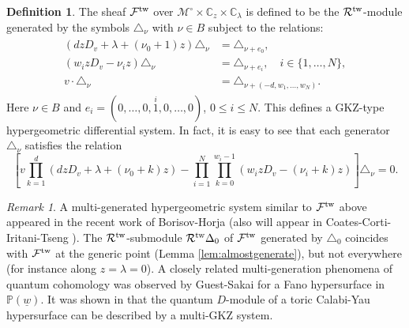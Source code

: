 \documentclass[11pt]{amsart}
\theoremstyle{definition} %
\newtheorem{defn}[thm]{Definition} %
\theoremstyle{remark} %
\newtheorem{rem}[thm]{Remark}%
\newcommand{\CC}{\mathbb C}
\newcommand{\PP}{\mathbb P}
\newcommand{\tw}{{\rm tw}}
\newcommand{\cMo}{\mathcal{M}^\circ}
\newcommand{\cF}{\mathcal{F}}
\newcommand{\cR}{\mathcal{R}}
\newcommand{\uw}{\underline{w}}
\begin{document}
\begin{defn} 
The sheaf $\cF^\tw$ over $\cMo\times \CC_z 
\times \CC_\lambda$ is defined to be the $\cR^\tw$-module 
generated by the symbols $\triangle_{\nu}$ with $\nu\in B$ 
subject to the relations: 
\begin{align} 
\label{eq:relations-cFtw}
\begin{split} 
\left(d z D_v +\lambda + (\nu_0+1) z\right) 
\triangle_{\nu} & = \triangle_{\nu + e_0}, \\ 
\left(w_i z D_v -\nu_i z \right) \triangle_\nu 
& = \triangle_{\nu+ e_i}, \quad i\in \{1,\dots, N\}, \\ 
v \cdot \triangle_{\nu} & = \triangle_{\nu + (-d,w_1,\dots,w_N)}. 
\end{split} 
\end{align} 
Here $\nu\in B$ and 
$e_i = (0,\dots, 0, \overset{i}{1},0,\dots, 0)$, $0\le i\le N$. 
This defines a GKZ-type hypergeometric 
differential system. 
In fact, it is easy to see that  
each generator $\triangle_\nu$ satisfies the relation 
\begin{equation} 
\label{eq:GKZrelation_of_Delta} 
\left[ 
v \prod_{k=1}^d (d z D_v + \lambda + (\nu_0 + k) z) - 
\prod_{i=1}^N \prod_{k=0}^{w_i-1} 
(w_i z D_v - (\nu_i+k) z) 
\right] \triangle_\nu = 0. 
\end{equation} 
\end{defn} 

\begin{rem} 
A multi-generated hypergeometric system similar to $\cF^\tw$ 
above appeared in the recent work of Borisov-Horja 
\cite{Borisov-Horja:BB} 
(also will appear in Coates-Corti-Iritani-Tseng \cite{CCIT:toric}). 
The $\cR^\tw$-submodule $\cR^\tw \Delta_0$ of 
$\cF^\tw$ generated by $\triangle_0$ coincides with 
$\cF^\tw$ at the generic point (Lemma \ref{lem:almostgenerate}),  
but not everywhere (for instance along $z=\lambda=0$). 
A closely related multi-generation phenomena 
of quantum cohomology was observed by 
Guest-Sakai \cite{Guest-Sakai} for a Fano hypersurface in $\PP(\uw)$. 
It was shown in \cite{Iritani:period} that 
the quantum $D$-module of a toric Calabi-Yau hypersurface 
can be described by a multi-GKZ system. 
\end{rem} 
\end{document}
